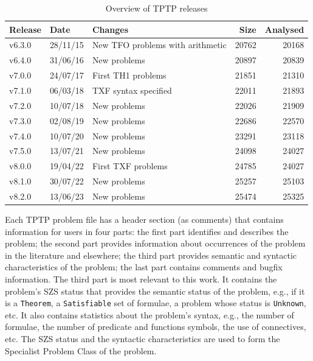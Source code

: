 \documentclass[runningheads]{llncs}
\begin{document}
\begin{table}[b!]
\begin{center}
\setlength{\tabcolsep}{4pt}
\begin{tabular}{ll|l|rr}
Release & Date     & Changes                                 & Size & Analysed \\
\hline
v6.3.0  & 28/11/15 & New TFO problems with arithmetic        &   20762 & 20168 \\
v6.4.0  & 31/06/16 & New problems                            &   20897 & 20839 \\
v7.0.0  & 24/07/17 & First TH1 problems                      &   21851 & 21310 \\
v7.1.0  & 06/03/18 & TXF syntax specified                    &   22011 & 21893 \\
v7.2.0  & 10/07/18 & New problems                            &   22026 & 21909 \\
v7.3.0  & 02/08/19 & New problems                            &   22686 & 22570 \\
v7.4.0  & 10/07/20 & New problems                            &   23291 & 23118 \\
v7.5.0  & 13/07/21 & New problems                            &   24098 & 24027 \\
v8.0.0  & 19/04/22 & First TXF problems                      &   24785 & 24027 \\
v8.1.0  & 30/07/22 & New problems                            &   25257 & 25103 \\
v8.2.0  & 13/06/23 & New problems                            &   25474 & 25325 \\
\end{tabular}
\end{center}
\caption{Overview of TPTP releases}
\label{TPTPReleases}
\end{table}

Each TPTP problem file has a header section (as comments) that contains information for users
in four parts:
the first part identifies and describes the problem;
the second part provides information about occurrences of the problem in the literature and 
elsewhere;
the third part provides semantic and syntactic characteristics of the problem;
the last part contains comments and bugfix information.
The third part is most relevant to this work. 
It contains the problem's SZS status \cite{SZS03} that provides the semantic status of the 
problem, e.g., if it is a {\tt Theorem}, a {\tt Satisfiable} set of formulae, a problem whose 
status is {\tt Unknown}, etc.
It also contains statistics about the problem's syntax, e.g., the number of formulae, the 
number of predicate and functions symbols, the use of connectives, etc.
The SZS status and the syntactic characteristics are used to form the Specialist Problem Class
of the problem.
\end{document}
